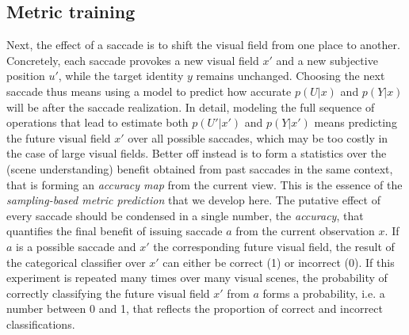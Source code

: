 \subsection*{Metric training}
Next, the effect of a saccade is to shift the visual field from one place to another.
Concretely, each saccade provokes a new visual field $x'$ and a new subjective position $u'$, while the target identity $y$ remains unchanged.
Choosing the next saccade thus means using a model to predict how accurate $p(U|x)$ and $p(Y|x)$ will be after the saccade realization.
In detail, modeling the full sequence of operations that lead to estimate both $p(U'|x')$ and $p(Y|x')$ means predicting the future visual field $x'$ over all possible saccades, which may be too costly in the case of large visual fields.
Better off instead is to form a statistics over the (scene understanding) benefit obtained from past saccades in the same context, that is forming an \emph{accuracy map} from the current view. This is the essence of the \emph{sampling-based metric prediction} that we develop here. The putative effect of every saccade should be condensed in a single number, the \emph{accuracy}, that quantifies the final benefit of issuing saccade $a$ %
from the current observation $x$. If $a$ is a possible saccade and $x'$ the corresponding future visual field, the result of the categorical classifier over $x'$ can either be correct (1) or incorrect (0).
If this experiment is repeated many times over many visual scenes, the probability of correctly classifying the future visual field $x'$ from $a$ forms a probability, i.e. a number between 0 and 1, that reflects the proportion of correct and incorrect classifications.
